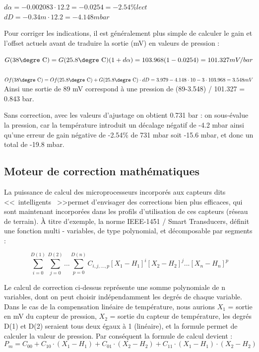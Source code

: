 \documentclass[main.tex]{subfiles}
\begin{document}
$d\alpha = -0.002083 \cdot 12.2 = -0.0254 = -2.54 \% lect $
\\
$dD = -0.34 m \cdot 12.2 = - 4.148 mbar $

Pour corriger les indications, il est généralement plus simple de calculer le gain et l'offset actuels avant de traduire la sortie (mV) en valeurs de pression :

$G(38 \text{\degre C}) = G(25.8 \text{\degre C}) (1 + d \alpha) = 103.968(1-0.0254) = 101.327 mV/bar $
\\
\\
$Of(38 \text{\degre C}) = Of(25.8 \text{\degre C}) + G(25.8 \text{\degre C}) \cdot dD = 3.979 - 4.148 \cdot 10-3 \cdot 103.968 = 3.548 mV$
\\

Ainsi une sortie de 89 mV correspond à une pression de (89-3.548) / 101.327 = 0.843 bar.

Sans correction, avec les valeurs d'ajustage on obtient 0.731 bar : on sous-évalue la pression, car la température introduit un décalage négatif de -4.2 mbar ainsi qu'une erreur de gain négative de -2.54\% de 731 mbar soit -15.6 mbar, et donc un total de -19.8 mbar.

\subsection{Moteur de correction mathématiques}

La puissance de calcul des microprocesseurs incorporés aux capteurs dits \textless\textless\ intelligents \ \textgreater\textgreater permet d'envisager des corrections bien plus efficaces, qui sont maintenant incorporées dans les profils d'utilisation de ces capteurs (réseau de terrain).
À titre d'exemple, la norme IEEE-1451 / Smart Transducers, définit une fonction multi - variables, de type polynomial, et décomposable par segments :

\begin{equation}
    \displaystyle\sum_{i=0}^{D(1)}
    \displaystyle\sum_{j=0}^{D(2)} \text{...}
    \displaystyle\sum_{p=0}^{D(n)} C_{i,j,...,p} [X_1-H_1]^i[X_2-H_2]^j \text{...} [X_n-H_n]^p
\end{equation}

Le calcul de correction ci-dessus représente une somme polynomiale de n variables, dont on peut choisir indépendamment les degrés de chaque variable. Dans le cas de la compensation linéaire de température, nous aurions $X_1$ = sortie en mV du capteur de pression, $X_2$ = sortie du capteur de température, les degrés D(1) et D(2) seraient tous deux égaux à 1 (linéaire), et la formule permet de calculer la valeur de pression. Par conséquent la formule de calcul devient :
\begin{equation}
    P_m =C_{00} + C_{10} \cdot (X_1-H_1)+C_{01} \cdot (X_2-H_2) + C_{11}\cdot(X_1-H_1) \cdot (X_2-H_2)
\end{equation}
\end{document}
